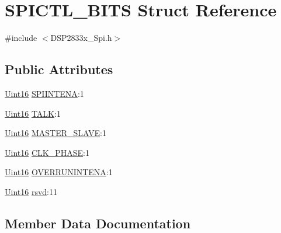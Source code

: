 \hypertarget{struct_s_p_i_c_t_l___b_i_t_s}{}\section{S\+P\+I\+C\+T\+L\+\_\+\+B\+I\+T\+S Struct Reference}
\label{struct_s_p_i_c_t_l___b_i_t_s}


{\ttfamily \#include $<$D\+S\+P2833x\+\_\+\+Spi.\+h$>$}

\subsection*{Public Attributes}
\begin{DoxyCompactItemize}
\item 
\hyperlink{_d_s_p2833x___device_8h_a59a9f6be4562c327cbfb4f7e8e18f08b}{Uint16} \hyperlink{struct_s_p_i_c_t_l___b_i_t_s_a4e4cbbc8a7d48509de304a2911e93507}{S\+P\+I\+I\+N\+T\+E\+N\+A}\+:1
\item 
\hyperlink{_d_s_p2833x___device_8h_a59a9f6be4562c327cbfb4f7e8e18f08b}{Uint16} \hyperlink{struct_s_p_i_c_t_l___b_i_t_s_a142876bc7ff47d03eb87265b19e7b0df}{T\+A\+L\+K}\+:1
\item 
\hyperlink{_d_s_p2833x___device_8h_a59a9f6be4562c327cbfb4f7e8e18f08b}{Uint16} \hyperlink{struct_s_p_i_c_t_l___b_i_t_s_a0b97eb422556566b347383f16e56045f}{M\+A\+S\+T\+E\+R\+\_\+\+S\+L\+A\+V\+E}\+:1
\item 
\hyperlink{_d_s_p2833x___device_8h_a59a9f6be4562c327cbfb4f7e8e18f08b}{Uint16} \hyperlink{struct_s_p_i_c_t_l___b_i_t_s_a37becde90fd7766bb76e0c6bdb30311c}{C\+L\+K\+\_\+\+P\+H\+A\+S\+E}\+:1
\item 
\hyperlink{_d_s_p2833x___device_8h_a59a9f6be4562c327cbfb4f7e8e18f08b}{Uint16} \hyperlink{struct_s_p_i_c_t_l___b_i_t_s_a16cfb2161bb5f9375506331d10b973dc}{O\+V\+E\+R\+R\+U\+N\+I\+N\+T\+E\+N\+A}\+:1
\item 
\hyperlink{_d_s_p2833x___device_8h_a59a9f6be4562c327cbfb4f7e8e18f08b}{Uint16} \hyperlink{struct_s_p_i_c_t_l___b_i_t_s_a151939b47391294474e4a2e62636a035}{rsvd}\+:11
\end{DoxyCompactItemize}


\subsection{Member Data Documentation}
\hypertarget{struct_s_p_i_c_t_l___b_i_t_s_a37becde90fd7766bb76e0c6bdb30311c}{}
